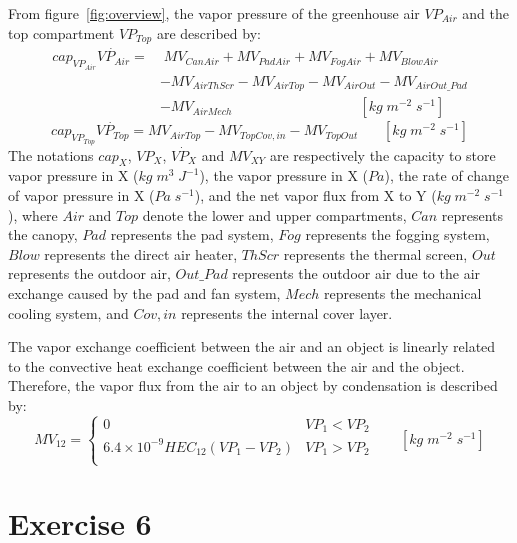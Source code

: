 \documentclass[a4paper]{article}
\begin{document}
From figure~\ref{fig:overview}, the vapor pressure of the greenhouse air \(VP_{Air}\) and the top compartment \(VP_{Top}\) are described by: \\
\begin{equation}
  \begin{split}
    cap_{VP_{Air}}\dot{VP_{Air}} = &\;MV_{CanAir} + MV_{PadAir} + MV_{FogAir} + MV_{BlowAir} \\
    & -MV_{AirThScr} - MV_{AirTop} - MV_{AirOut} - MV_{AirOut\_Pad} \\
    & -MV_{AirMech} ~~~~~~~~~~~~~~~~~~~~~~~~~~~~~~~~~~~~~~~~~ [kg\;m^{-2}\;s^{-1}]
  \end{split}
\end{equation}
\begin{equation}
  cap_{VP_{Top}}\dot{VP_{Top}} = MV_{AirTop} - MV_{TopCov,in} - MV_{TopOut} ~~~~~~~~ [kg\;m^{-2}\;s^{-1}]
\end{equation}
The notations \(cap_X\), \(VP_X\), \(\dot{VP_X}\) and \(MV_{XY}\) are respectively the capacity to store vapor pressure in X (\(kg\;m^3\;J^{-1}\)),
the vapor pressure in X (\(Pa\)), the rate of change of vapor pressure in X (\(Pa\;s^{-1}\)), and the net vapor flux from X to Y (\(kg\;m^{-2}\;s^{-1}\)),
where \(Air\) and \(Top\) denote the lower and upper compartments, \(Can\) represents the canopy, \(Pad\) represents the pad system, \(Fog\) represents the fogging system,
\(Blow\) represents the direct air heater, \(ThScr\) represents the thermal screen, \(Out\) represents the outdoor air,
\(Out\_Pad\) represents the outdoor air due to the air exchange caused by the pad and fan system, \(Mech\) represents the mechanical cooling system,
and \(Cov,in\) represents the internal cover layer.

The vapor exchange coefficient between the air and an object is linearly related to the convective heat exchange coefficient between the air and the object.
Therefore, the vapor flux from the air to an object by condensation is described by:
\begin{equation}
  MV_{12} = \begin{cases}
    0                                        & VP_1 < VP_2 \\
    6.4 \times 10^{-9} HEC_{12}(VP_1 - VP_2) & VP_1 > VP_2 \\
  \end{cases}
  ~~~~~~~~ [kg\;m^{-2}\;s^{-1}]
\end{equation}


\section{Exercise 6}
\end{document}
